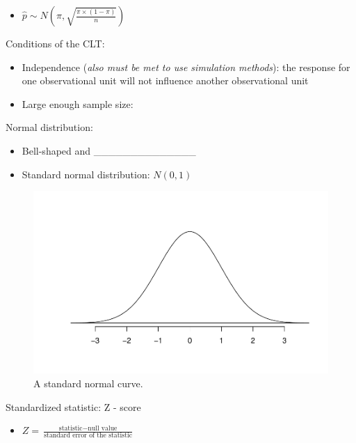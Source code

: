 \documentclass[
]{report}
\providecommand{\tightlist}{%
  \setlength{\itemsep}{0pt}\setlength{\parskip}{0pt}}
\begin{document}
\begin{itemize}
\tightlist
\item
  \(\hat{p} \sim N (\pi, \sqrt{\frac{\pi \times (1-\pi)}{n}})\)
\end{itemize}

Conditions of the CLT:

\begin{itemize}
\tightlist
\item
  Independence (\emph{also must be met to use simulation methods}): the response for one observational unit will not influence another observational unit
\end{itemize}

\vspace{1mm}

\begin{itemize}
\tightlist
\item
  Large enough sample size:
\end{itemize}

\vspace{0.3in}

Normal distribution:

\begin{itemize}
\item
  Bell-shaped and \_\_\_\_\_\_\_\_\_\_\_\_\_\_
\item
  Standard normal distribution: \(N(0,1)\)
\end{itemize}

\begin{figure}

{\centering \includegraphics[width=0.5\linewidth]{07-LN07-1cat_theory_files/figure-latex/simpleNormalc-1} 

}

\caption{A standard normal curve.}\label{fig:simpleNormalc}
\end{figure}

Standardized statistic: Z - score

\vspace{1mm}

\begin{itemize}
\tightlist
\item
  \(Z = \frac{\mbox{statistic} - \mbox{null value}}{\mbox{standard error of the statistic}}\)
\end{itemize}
\end{document}
